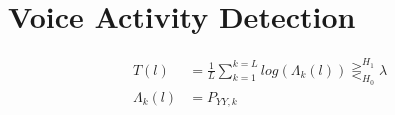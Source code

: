 \section{Voice Activity Detection} \label{sec:vad}
\begin{align}
  T(l) &= \frac{1}{L} \sum_{k=1}^{k=L} log(\Lambda_{k}(l)) \gtreqless_{H_{0}}^{H_{1}} \lambda
  \label{eq:vad1}\\
  \Lambda_{k}(l) &= P_{YY,k}
  \label{eq:vad2}
\end{align}
